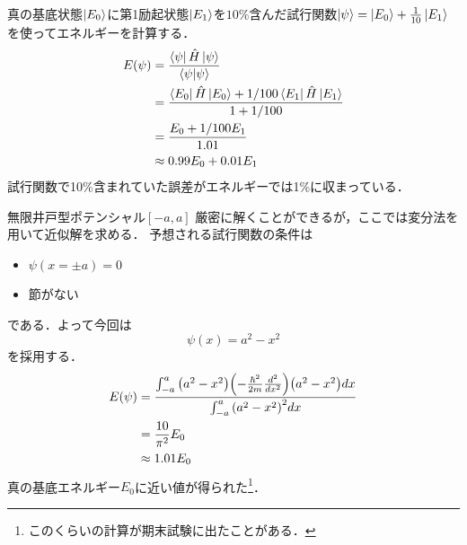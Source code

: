 \documentclass{report}
\begin{document}
  真の基底状態$\ket{E_0}$に第1励起状態$\ket{E_1}$を$10\%$含んだ試行関数$\ket{\psi}=\ket{E_0}+\frac{1}{10}\ket{E_1}$を使ってエネルギーを計算する．
  \begin{align}
    E(\psi)&=\frac{\bra{\psi}\hat{H}\ket{\psi}}{\braket{\psi}{\psi}}\\
    &=\frac{\bra{E_0}\hat{H}\ket{E_0}+1/100\bra{E_1}\hat{H}\ket{E_1}}{1+1/100}\\
    &=\frac{E_0+1/100E_1}{1.01}\\
    &\approx 0.99E_0+0.01E_1
  \end{align}
  試行関数で10\%含まれていた誤差がエネルギーでは1\%に収まっている．
  \begin{myex}{}{}
    無限井戸型ポテンシャル$[-a,a]$
    厳密に解くことができるが，ここでは変分法を用いて近似解を求める．
    予想される試行関数の条件は
    \begin{itemize}
      \item $\psi(x=\pm a)=0$
      \item 節がない
    \end{itemize}
    である．よって今回は
    \begin{equation}
      \psi(x)=a^2-x^2
    \end{equation}
    を採用する．
    \begin{align}
      E(\psi)&=\frac{\int_{-a}^{a}\qty(a^2-x^2)\qty(-\frac{\hbar^2}{2m}\frac{d^2}{dx^2})\qty(a^2-x^2)dx}{\int_{-a}^{a}\qty(a^2-x^2)^2dx}\\
      &=\frac{10}{\pi^2}E_0\\
      &\approx 1.01E_0
    \end{align}
    真の基底エネルギー$E_0$に近い値が得られた\footnote{このくらいの計算が期末試験に出たことがある．}．
  \end{myex}
\end{document}
